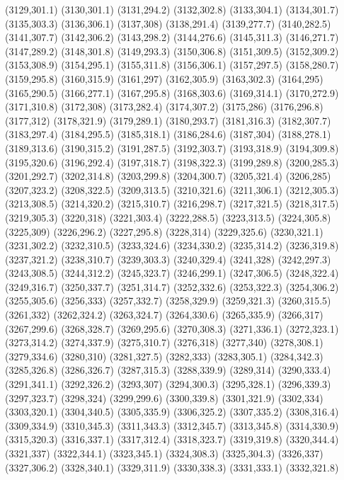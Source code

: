 (3129,301.1)
(3130,301.1)
(3131,294.2)
(3132,302.8)
(3133,304.1)
(3134,301.7)
(3135,303.3)
(3136,306.1)
(3137,308)
(3138,291.4)
(3139,277.7)
(3140,282.5)
(3141,307.7)
(3142,306.2)
(3143,298.2)
(3144,276.6)
(3145,311.3)
(3146,271.7)
(3147,289.2)
(3148,301.8)
(3149,293.3)
(3150,306.8)
(3151,309.5)
(3152,309.2)
(3153,308.9)
(3154,295.1)
(3155,311.8)
(3156,306.1)
(3157,297.5)
(3158,280.7)
(3159,295.8)
(3160,315.9)
(3161,297)
(3162,305.9)
(3163,302.3)
(3164,295)
(3165,290.5)
(3166,277.1)
(3167,295.8)
(3168,303.6)
(3169,314.1)
(3170,272.9)
(3171,310.8)
(3172,308)
(3173,282.4)
(3174,307.2)
(3175,286)
(3176,296.8)
(3177,312)
(3178,321.9)
(3179,289.1)
(3180,293.7)
(3181,316.3)
(3182,307.7)
(3183,297.4)
(3184,295.5)
(3185,318.1)
(3186,284.6)
(3187,304)
(3188,278.1)
(3189,313.6)
(3190,315.2)
(3191,287.5)
(3192,303.7)
(3193,318.9)
(3194,309.8)
(3195,320.6)
(3196,292.4)
(3197,318.7)
(3198,322.3)
(3199,289.8)
(3200,285.3)
(3201,292.7)
(3202,314.8)
(3203,299.8)
(3204,300.7)
(3205,321.4)
(3206,285)
(3207,323.2)
(3208,322.5)
(3209,313.5)
(3210,321.6)
(3211,306.1)
(3212,305.3)
(3213,308.5)
(3214,320.2)
(3215,310.7)
(3216,298.7)
(3217,321.5)
(3218,317.5)
(3219,305.3)
(3220,318)
(3221,303.4)
(3222,288.5)
(3223,313.5)
(3224,305.8)
(3225,309)
(3226,296.2)
(3227,295.8)
(3228,314)
(3229,325.6)
(3230,321.1)
(3231,302.2)
(3232,310.5)
(3233,324.6)
(3234,330.2)
(3235,314.2)
(3236,319.8)
(3237,321.2)
(3238,310.7)
(3239,303.3)
(3240,329.4)
(3241,328)
(3242,297.3)
(3243,308.5)
(3244,312.2)
(3245,323.7)
(3246,299.1)
(3247,306.5)
(3248,322.4)
(3249,316.7)
(3250,337.7)
(3251,314.7)
(3252,332.6)
(3253,322.3)
(3254,306.2)
(3255,305.6)
(3256,333)
(3257,332.7)
(3258,329.9)
(3259,321.3)
(3260,315.5)
(3261,332)
(3262,324.2)
(3263,324.7)
(3264,330.6)
(3265,335.9)
(3266,317)
(3267,299.6)
(3268,328.7)
(3269,295.6)
(3270,308.3)
(3271,336.1)
(3272,323.1)
(3273,314.2)
(3274,337.9)
(3275,310.7)
(3276,318)
(3277,340)
(3278,308.1)
(3279,334.6)
(3280,310)
(3281,327.5)
(3282,333)
(3283,305.1)
(3284,342.3)
(3285,326.8)
(3286,326.7)
(3287,315.3)
(3288,339.9)
(3289,314)
(3290,333.4)
(3291,341.1)
(3292,326.2)
(3293,307)
(3294,300.3)
(3295,328.1)
(3296,339.3)
(3297,323.7)
(3298,324)
(3299,299.6)
(3300,339.8)
(3301,321.9)
(3302,334)
(3303,320.1)
(3304,340.5)
(3305,335.9)
(3306,325.2)
(3307,335.2)
(3308,316.4)
(3309,334.9)
(3310,345.3)
(3311,343.3)
(3312,345.7)
(3313,345.8)
(3314,330.9)
(3315,320.3)
(3316,337.1)
(3317,312.4)
(3318,323.7)
(3319,319.8)
(3320,344.4)
(3321,337)
(3322,344.1)
(3323,345.1)
(3324,308.3)
(3325,304.3)
(3326,337)
(3327,306.2)
(3328,340.1)
(3329,311.9)
(3330,338.3)
(3331,333.1)
(3332,321.8)
